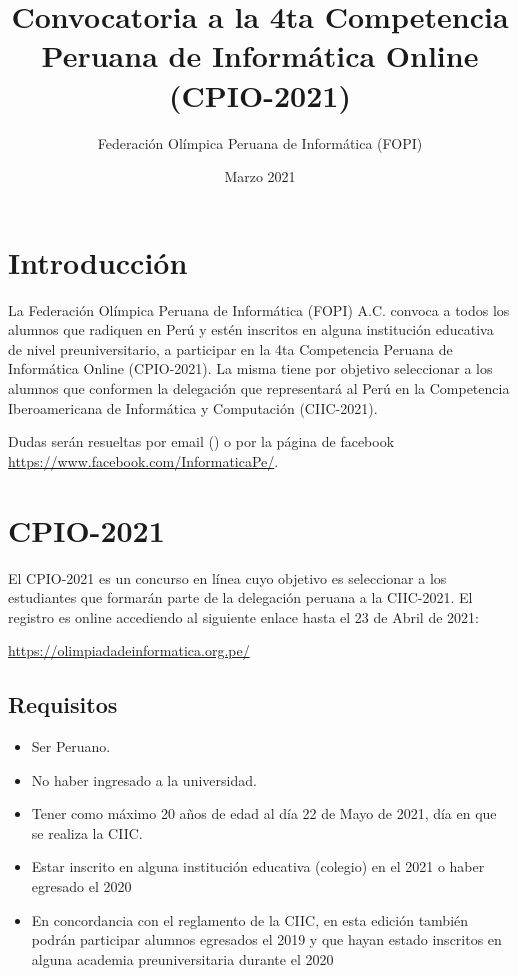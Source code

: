 \documentclass{article}
\title{Convocatoria a la 4ta Competencia Peruana de Informática Online (CPIO-2021)
}
\author{Federación Olímpica Peruana de Informática (FOPI)}
\date{Marzo 2021}
\begin{document}
\maketitle

\section{Introducción}

La Federación Olímpica Peruana de Informática (FOPI) A.C. convoca a todos los alumnos que radiquen en Perú y estén inscritos en alguna institución educativa de nivel preuniversitario, a participar en la 4ta Competencia Peruana de Informática Online (CPIO-2021). La misma tiene por objetivo seleccionar a los alumnos que conformen la delegación que representará al Perú en la Competencia Iberoamericana de Informática y Computación (CIIC-2021).

Dudas serán resueltas por email 
({\color{blue}{olimpiadaperuanainformatica@gmail.com})}
o por la página de facebook \url{https://www.facebook.com/InformaticaPe/}.



\section{CPIO-2021}

El CPIO-2021 es un concurso en línea cuyo objetivo
es seleccionar a los estudiantes que formarán parte de la delegación peruana a la CIIC-2021.
El registro es online accediendo al siguiente enlace
{\color{red} hasta el 23 de Abril de 2021}:

\begin{center}
\url{https://olimpiadadeinformatica.org.pe/}
\end{center}

\subsection{Requisitos}

\begin{itemize}
    \item Ser Peruano.
    \item No haber ingresado a la universidad.
    \item Tener como máximo 20 años de edad al día 22 de Mayo de 2021, día en que se realiza la CIIC.
    \item Estar inscrito en alguna institución educativa (colegio) en el 2021 o haber egresado el 2020 
    \item En concordancia con el reglamento de la CIIC, en esta edición también podrán participar alumnos egresados el 2019 y que hayan estado inscritos en alguna academia preuniversitaria durante el 2020
\end{itemize}
\end{document}
